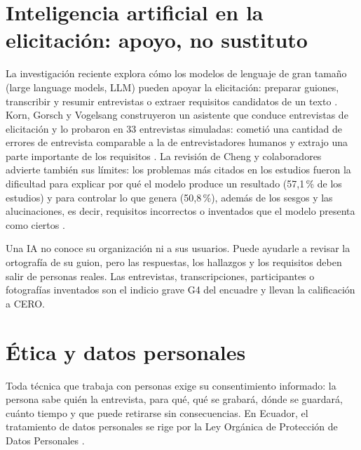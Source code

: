 \documentclass[11pt,a4paper,oneside]{report}
\begin{document}
\section{Inteligencia artificial en la elicitación: apoyo, no sustituto}

La investigación reciente explora cómo los modelos de lenguaje de gran tamaño (large language models, LLM) pueden apoyar la elicitación: preparar guiones, transcribir y resumir entrevistas o extraer requisitos candidatos de un texto \citep{siddeshwar_2024,cheng_genai_re_2026}. Korn, Gorsch y Vogelsang construyeron un asistente que conduce entrevistas de elicitación y lo probaron en 33 entrevistas simuladas: cometió una cantidad de errores de entrevista comparable a la de entrevistadores humanos y extrajo una parte importante de los requisitos \citep{korn_2025}. La revisión de Cheng y colaboradores advierte también sus límites: los problemas más citados en los estudios fueron la dificultad para explicar por qué el modelo produce un resultado (57,1\,\% de los estudios) y para controlar lo que genera (50,8\,\%), además de los sesgos y las alucinaciones, es decir, requisitos incorrectos o inventados que el modelo presenta como ciertos \citep{cheng_genai_re_2026}.

\begin{cuidado}
	Una IA no conoce su organización ni a sus usuarios. Puede ayudarle a revisar la ortografía de su guion, pero las respuestas, los hallazgos y los requisitos deben salir de personas reales. Las entrevistas, transcripciones, participantes o fotografías inventados son el indicio grave G4 del encuadre y llevan la calificación a CERO.
\end{cuidado}

\section{Ética y datos personales}\label{sec:etica}

Toda técnica que trabaja con personas exige su consentimiento informado: la persona sabe quién la entrevista, para qué, qué se grabará, dónde se guardará, cuánto tiempo y que puede retirarse sin consecuencias. En Ecuador, el tratamiento de datos personales se rige por la Ley Orgánica de Protección de Datos Personales \citep{lopdp_2021}.
\end{document}

